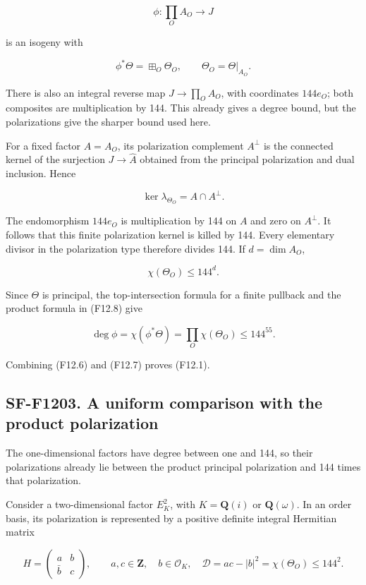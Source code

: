 \[
 \phi:\prod_O A_O\longrightarrow J
 \tag{F12.7}
\]

is an isogeny with

\[
 \phi^*\Theta=\boxplus_O\Theta_O,\qquad
 \Theta_O=\Theta|_{A_O}.
 \tag{F12.8}
\]

There is also an integral reverse map \(J\to\prod_O A_O\), with
coordinates \(144e_O\); both composites are multiplication by 144. This
already gives a degree bound, but the polarizations give the sharper
bound used here.

For a fixed factor \(A=A_O\), its polarization complement \(A^\perp\) is
the connected kernel of the surjection \(J\to\widehat A\) obtained from
the principal polarization and dual inclusion. Hence

\[
 \ker\lambda_{\Theta_O}=A\cap A^\perp.
\]

The endomorphism \(144e_O\) is multiplication by 144 on \(A\) and zero
on \(A^\perp\). It follows that this finite polarization kernel is
killed by 144. Every elementary divisor in the polarization type
therefore divides 144. If \(d=\dim A_O\),

\[
 \chi(\Theta_O)\le144^d.
 \tag{F12.9}
\]

Since \(\Theta\) is principal, the top-intersection formula for a finite
pullback and the product formula in (F12.8) give

\[
 \deg\phi=\chi(\phi^*\Theta)
       =\prod_O\chi(\Theta_O)\le144^{55}.
 \tag{F12.10}
\]

Combining (F12.6) and (F12.7) proves (F12.1).

\subsection{SF-F1203. A uniform comparison with the product
polarization}\label{SF-F1203}

The one-dimensional factors have degree between one and 144, so their
polarizations already lie between the product principal polarization and
144 times that polarization.

Consider a two-dimensional factor \(E_K^2\), with \(K=\mathbf Q(i)\) or
\(\mathbf Q(\omega)\). In an order basis, its polarization is
represented by a positive definite integral Hermitian matrix

\[
 H=\begin{pmatrix}a&b\\\bar b&c\end{pmatrix},
 \qquad a,c\in\mathbf Z,\quad b\in\mathcal O_K,\quad
 \mathcal D=ac-|b|^2=\chi(\Theta_O)\le144^2.
 \tag{F12.11}
\]

